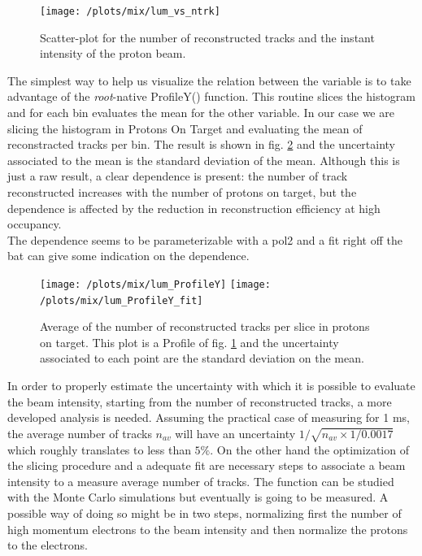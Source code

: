 \documentclass[12pt,a4paper,openright, oneside, titlepage]{book} %
\begin{document}
\begin{figure}[!htb]
\centering
\texttt{[image: /plots/mix/lum\_vs\_ntrk]}
\caption[Proton on target and number of tracks]
{Scatter-plot for the number of reconstructed tracks and the instant intensity of the proton beam.}
\label{_lum_vs_ntrk}
\end{figure}

\noindent The simplest way to help us visualize the relation between the variable is to take advantage of the \textit{root}-native ProfileY() function. 
This routine slices the histogram and for each bin evaluates the mean for the other variable. 
In our case we are slicing the histogram in Protons On Target and evaluating the mean of reconstracted tracks per bin. 
The result is shown in fig. \ref{_lum_ProfileY} and the uncertainty associated to the mean is the standard deviation of the mean.
Although this is just a raw result, a clear dependence is present: the number of track reconstructed increases with the number of protons on target, but the dependence is affected by the reduction in reconstruction efficiency at high occupancy.\\
The dependence seems to be parameterizable with a pol2 and a fit right off the bat can give some indication on the dependence.

\begin{figure}[!htb]
\centering
\texttt{[image: /plots/mix/lum\_ProfileY]}
\texttt{[image: /plots/mix/lum\_ProfileY\_fit]}
\caption[Beam intensity vs number of tracks Profile()]
{Average of the number of reconstructed tracks per slice in protons on target. This plot is a Profile of fig. \ref{_lum_vs_ntrk} and the uncertainty associated to each point are the standard deviation on the mean.}
\label{_lum_ProfileY}
\end{figure}

\noindent In order to properly estimate the uncertainty with which it is possible to evaluate the beam intensity, starting from the number of reconstructed tracks, a more developed analysis is needed.
Assuming the practical case of measuring for 1 ms, the average number of tracks $n_{av}$ will have an uncertainty $1/\sqrt{n_{av} \times 1/0.0017}$ which roughly translates to less than $5\%$. 
On the other hand the optimization of the slicing procedure and a adequate fit are necessary steps to associate a beam intensity to a measure average number of tracks.
The function can be studied with the Monte Carlo simulations but eventually is going to be measured.
A possible way of doing so might be in two steps, normalizing first the number of high momentum electrons to the beam intensity and then normalize the protons to the electrons.
\end{document}
